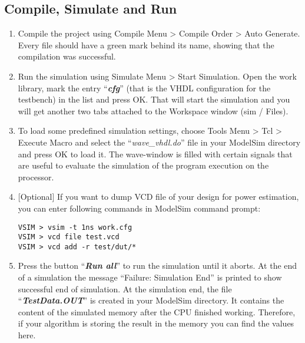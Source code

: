 \subsection{Compile, Simulate and Run}
\begin{enumerate}
\item Compile the project using Compile Menu \textgreater{} Compile Order \textgreater{} Auto Generate. Every file should have a green mark behind its name, showing that the compilation was successful. 
\item Run the simulation using Simulate Menu \textgreater{} Start Simulation. Open the work library, mark the entry ``\emph{\textbf{cfg}}'' (that is the VHDL configuration for the 	testbench) in the list and press OK. That will start the simulation and you will get another two tabs attached to the Workspace window (sim / Files).
\item To load some predefined simulation settings, choose Tools Menu \textgreater{} Tcl \textgreater{} Execute Macro and select the ``\emph{wave\_vhdl.do}'' file in your ModelSim directory and press OK to load it. The wave-window is filled with certain signals that are useful to evaluate the simulation of the program execution on the processor.
\item {[}Optional{]} If you want to dump VCD file of your design for power estimation, you can enter following commands in ModelSim command prompt:
\begin{lstlisting}
VSIM > vsim -t 1ns work.cfg
VSIM > vcd file test.vcd
VSIM > vcd add -r test/dut/*
\end{lstlisting}
\item Press the button ``\emph{\textbf{Run all}}'' to run the simulation until it aborts. At the end of a simulation the message ``Failure: Simulation End'' is printed to show successful end of simulation. At the simulation end, the file ``\emph{\textbf{TestData.OUT}}'' is created in your ModelSim directory. It contains the content of the simulated memory after the CPU finished working. Therefore, if your algorithm is storing the result in the memory you can find the values here.
\end{enumerate}